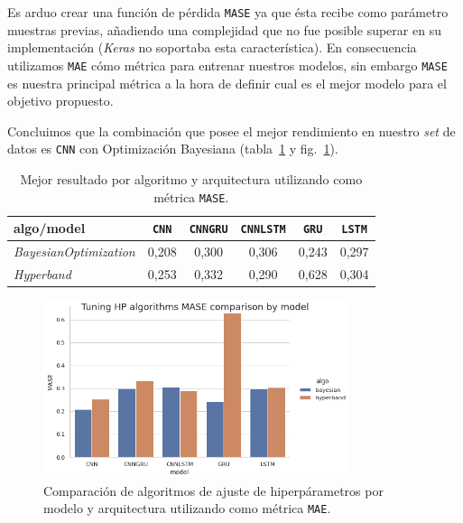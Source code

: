 \documentclass[a4paper,12pt]{article}
\begin{document}
Es arduo crear una función de pérdida \texttt{MASE} ya que ésta recibe como parámetro muestras previas, añadiendo una complejidad que no fue posible superar en su implementación (\textit{Keras} no soportaba esta característica). En consecuencia utilizamos \texttt{MAE} cómo métrica para entrenar nuestros modelos, sin embargo \texttt{MASE} es nuestra principal métrica a la hora de definir cual es el mejor modelo para el objetivo propuesto.

Concluimos que la combinación que posee el mejor rendimiento en nuestro \textit{set} de datos es \texttt{CNN} con Optimización Bayesiana (tabla~\ref{tab:algo_vs_arch_mase} y fig.~\ref{fig:algo_comparison_mase}).

\begin{table}[H]
\centering
\begin{tabular}{l|ccccc}
\hline
algo/model & \texttt{CNN} & \texttt{CNNGRU} & \texttt{CNNLSTM} & \texttt{GRU} & \texttt{LSTM} \\ \hline
\textit{BayesianOptimization}         & 0,208        & 0,300           & 0,306            & 0,243        & 0,297         \\
\textit{Hyperband}         & 0,253        & 0,332           & 0,290            & 0,628        & 0,304         \\ \hline
\end{tabular}
\caption{Mejor resultado por algoritmo y arquitectura utilizando como métrica \texttt{MASE}.}
\label{tab:algo_vs_arch_mase}
\end{table}

\begin{figure}[H]
	\begin{center}
	\includegraphics[width=0.8\textwidth]{model_vs_algo_hp_mase.png}
  	\caption{Comparación de algoritmos de ajuste de hiperpárametros por modelo y arquitectura utilizando como métrica \texttt{MAE}.}
  	\label{fig:algo_comparison_mase}
  	\end{center}
\end{figure}
\end{document}
